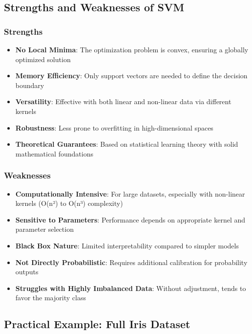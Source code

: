 \documentclass[
  letterpaper,
  DIV=11,
  numbers=noendperiod]{scrreprt}
\providecommand{\tightlist}{%
  \setlength{\itemsep}{0pt}\setlength{\parskip}{0pt}}\usepackage{longtable,booktabs,array}
\begin{document}
\subsection{Strengths and Weaknesses of
SVM}\label{strengths-and-weaknesses-of-svm}

\subsubsection{Strengths}\label{strengths}

\begin{itemize}
\tightlist
\item
  \textbf{No Local Minima}: The optimization problem is convex, ensuring
  a globally optimized solution
\item
  \textbf{Memory Efficiency}: Only support vectors are needed to define
  the decision boundary
\item
  \textbf{Versatility}: Effective with both linear and non-linear data
  via different kernels
\item
  \textbf{Robustness}: Less prone to overfitting in high-dimensional
  spaces
\item
  \textbf{Theoretical Guarantees}: Based on statistical learning theory
  with solid mathematical foundations
\end{itemize}

\subsubsection{Weaknesses}\label{weaknesses}

\begin{itemize}
\tightlist
\item
  \textbf{Computationally Intensive}: For large datasets, especially
  with non-linear kernels (O(n²) to O(n³) complexity)
\item
  \textbf{Sensitive to Parameters}: Performance depends on appropriate
  kernel and parameter selection
\item
  \textbf{Black Box Nature}: Limited interpretability compared to
  simpler models
\item
  \textbf{Not Directly Probabilistic}: Requires additional calibration
  for probability outputs
\item
  \textbf{Struggles with Highly Imbalanced Data}: Without adjustment,
  tends to favor the majority class
\end{itemize}

\subsection{Practical Example: Full Iris
Dataset}\label{practical-example-full-iris-dataset}
\end{document}
